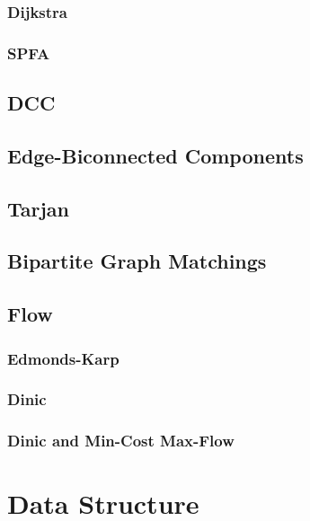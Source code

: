 \documentclass[10pt,a4paper]{article}
\newcommand{\codedir}{../code/}
\newcommand{\code}[2][]{%
}
\begin{document}
\begin{multicols}{2}
\subsubsection{Dijkstra}
\code{Shortest Path(Dijkstra).cpp}

\subsubsection{SPFA}
\code{Shortest Path(SPFA).cpp}

\subsection{DCC}
\code{DCC.cpp}

\subsection{Edge-Biconnected Components}
\code{EDCC.cpp}

\subsection{Tarjan}
\code{Tarjan.cpp}

\subsection{Bipartite Graph Matchings}
\code{Bipartite Graph Matchings.cpp}

\subsection{Flow}

\subsubsection{Edmonds-Karp}
\code{Edmonds_Karp.cpp}

\subsubsection{Dinic}
\code{Dinic.cpp}

\subsubsection{Dinic and Min-Cost Max-Flow}
\code{Flow (Zlw).cpp}

\newpage

\section{Data Structure}


\end{multicols}
\end{document}
